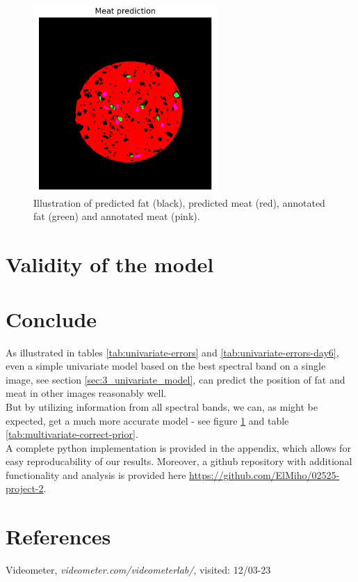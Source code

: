 \documentclass{article}
\begin{document}
\begin{figure}[H]
    \centering
    \includegraphics[width = 7cm]{meatPrediction.png}
    \caption{Illustration of predicted fat (black), predicted meat (red), annotated fat (green) and annotated meat (pink).}
    \label{meatpredict}
\end{figure}

\section{Validity of the model}
 

\section{Conclude}
As illustrated in tables \ref{tab:univariate-errors} and \ref{tab:univariate-errors-day6}, even a simple univariate model based on the best spectral band on a single image, see section \ref{sec:3_univariate_model}, can predict the position of fat and meat in other images reasonably well. \\
But by utilizing information from all spectral bands, we can, as might be expected, get a much more accurate model - see figure \ref{meatpredict} and table \ref{tab:multivariate-correct-prior}. \\
A complete python implementation is provided in the appendix, which allows for easy reproducability of our results. Moreover, a github repository with additional functionality and analysis is provided here \url{https://github.com/ElMiho/02525-project-2}.



\section{References}
\begin{thebibliography}{9}
Videometer, \emph{videometer.com/videometerlab/}, visited: 12/03-23
\end{thebibliography}
\end{document}

